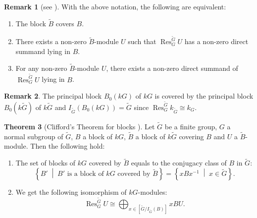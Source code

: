 \documentclass[pdftex,a4paper]{article}
\numberwithin{equation}{subsection}
\theoremstyle{definition}
\newtheorem{theorem}{Theorem}[section]
\newtheorem{remark}[theorem]{Remark}
\newcommand{\setmid}{\; \middle|\;}
\newcommand{\induc}{{\operatorname{Ind}\nolimits}}
\newcommand{\restr}{{\operatorname{Res}\nolimits}}
\newcommand{\inertiagp}{I}
\newcommand{\decompgp}{I}
\begin{document}
\begin{remark}[{see \cite[Theorem 15.1, Lemma 15.3]{MR860771}}]\label{Remark:cover}
	With the above notation, the following are equivalent:
	\begin{enumerate}
		\item The block \(\tilde{B}\) covers \(B\).
		\item There exists a non-zero \(\tilde{B}\)-module \(U\) such that \(\restr_G^{\tilde{G}} U\) has a non-zero direct summand lying in \(B\).
		\item For any non-zero \(\tilde{B}\)-module \(U\), there exists a non-zero direct summand of \(\restr_G^{\tilde{G}} U\) lying in \(B\).
	\end{enumerate}
\end{remark}

\begin{remark}
	The principal block \(B_0(kG)\) of \(kG\) is covered by the principal block \(B_0(k\tilde{G})\) of \(k\tilde{G}\) and \(\inertiagp_{\tilde{G}}(B_0(kG))=\tilde{G}\) since \(\restr_G^{\tilde{G}} k_{\tilde{G}} \cong k_G\).
\end{remark}

\begin{theorem}[{Clifford's Theorem for blocks \cite[Theorem 15.1, Lemma 15.3]{MR860771}}]\label{Clifford's Theorem block ver}
	Let \(\tilde{G}\) be a finite group, \(G\) a normal subgroup of \(\tilde{G}\), \(B\) a block of \(kG\), \(\tilde{B}\) a block of \(k\tilde{G}\) covering \(B\) and \(U\) a \(\tilde{B}\)-module. Then the following hold:
	\begin{enumerate}
		\item The set of blocks of \(kG\) covered by \(\tilde{B}\) equals to the conjugacy class of \(B\) in \(\tilde{G}\):
		      \begin{equation}
			      \left\{ B' \setmid \text{\(B'\) is a block of \(kG\) covered by \(\tilde{B}\)} \right\}=\left\{ xBx^{-1} \setmid x \in \tilde{G} \right\}.
		      \end{equation}
		\item We get the following isomorphism of \(kG\)-modules:
		      \begin{equation}
			      \restr_G^{\tilde{G}} U \cong \bigoplus_{x \in [\tilde{G}/\inertiagp_{\tilde{G}}(B)]}xBU.
		      \end{equation}
	\end{enumerate}
\end{theorem}
\end{document}
